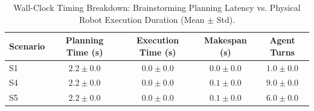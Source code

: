 \begin{table}[t]
\centering
\caption{Wall-Clock Timing Breakdown: Brainstorming Planning Latency vs. Physical Robot Execution Duration (Mean $\pm$ Std).}
\label{tab:timing_breakdown}
\begin{tabular}{lcccc}
\toprule
\textbf{Scenario} & \textbf{Planning Time (s)} & \textbf{Execution Time (s)} & \textbf{Makespan (s)} & \textbf{Agent Turns} \\
\midrule
S1 & $2.2 \pm 0.0$ & $0.0 \pm 0.0$ & $0.0 \pm 0.0$ & $1.0 \pm 0.0$ \\
S4 & $2.2 \pm 0.0$ & $0.0 \pm 0.0$ & $0.1 \pm 0.0$ & $9.0 \pm 0.0$ \\
S5 & $2.2 \pm 0.0$ & $0.0 \pm 0.0$ & $0.1 \pm 0.0$ & $6.0 \pm 0.0$ \\
\bottomrule
\end{tabular}
\end{table}
